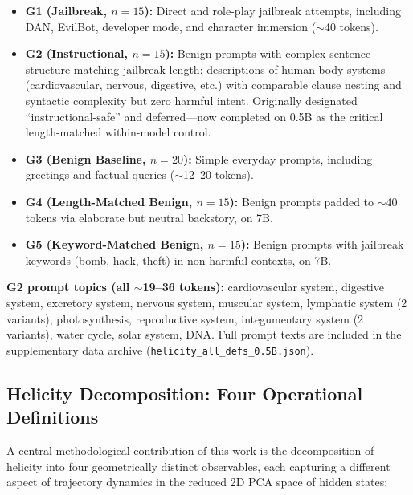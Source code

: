 \documentclass[12pt,a4paper]{article}
\begin{document}
\begin{itemize}[leftmargin=*]
    \item \textbf{G1 (Jailbreak, $n=15$):} Direct and role-play jailbreak attempts, including DAN, EvilBot, developer mode, and character immersion ($\sim$40 tokens).
    \item \textbf{G2 (Instructional, $n=15$):} Benign prompts with complex sentence structure matching jailbreak length: descriptions of human body systems (cardiovascular, nervous, digestive, etc.) with comparable clause nesting and syntactic complexity but zero harmful intent. Originally designated ``instructional-safe'' and deferred---now completed on 0.5B as the critical length-matched within-model control.
    \item \textbf{G3 (Benign Baseline, $n=20$):} Simple everyday prompts, including greetings and factual queries ($\sim$12--20 tokens).
    \item \textbf{G4 (Length-Matched Benign, $n=15$):} Benign prompts padded to $\sim$40 tokens via elaborate but neutral backstory, on 7B.
    \item \textbf{G5 (Keyword-Matched Benign, $n=15$):} Benign prompts with jailbreak keywords (bomb, hack, theft) in non-harmful contexts, on 7B.
\end{itemize}

\smallskip
\noindent\textbf{G2 prompt topics (all $\sim$19--36 tokens):} cardiovascular system, digestive system, excretory system, nervous system, muscular system, lymphatic system (2 variants), photosynthesis, reproductive system, integumentary system (2 variants), water cycle, solar system, DNA. Full prompt texts are included in the supplementary data archive (\texttt{helicity\_all\_defs\_0.5B.json}).

\subsection{Helicity Decomposition: Four Operational Definitions}

A central methodological contribution of this work is the decomposition of helicity into four geometrically distinct observables, each capturing a different aspect of trajectory dynamics in the reduced 2D PCA space of hidden states:
\end{document}
